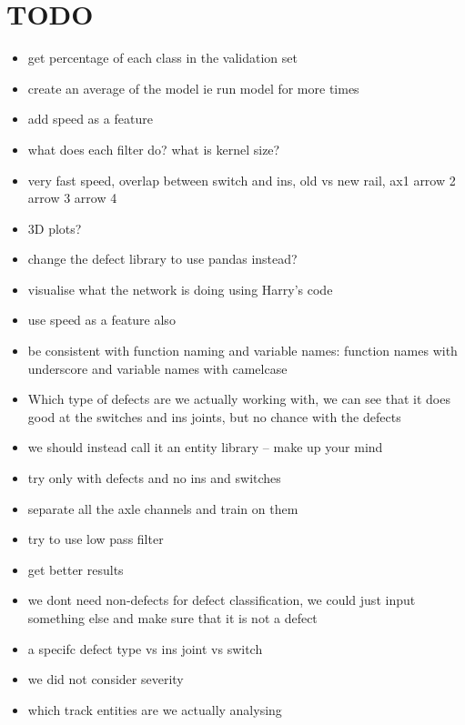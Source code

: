 \newpage
\section{TODO}
\begin{itemize}
	\item get percentage of each class in the validation set
	\item create an average of the model ie run model for more times
	\item add speed as a feature
	\item what does each filter do? what is kernel size?
	\item very fast speed, overlap between switch and ins, old vs new rail, ax1 arrow 2 arrow 3 arrow 4
	\item 3D plots?
	\item change the defect library to use pandas instead?
	\item visualise what the network is doing using Harry's code
	\item use speed as a feature also
	\item be consistent with function naming and variable names: function names with underscore and variable names with camelcase
	\item Which type of defects are we actually working with, we can see that it does good at the switches and ins joints, but no chance with the defects
	\item we should instead call it an entity library -- make up your mind
	\item try only with defects and no ins and switches
	\item separate all the axle channels and train on them
	\item try to use low pass filter
	\item get better results
	\item we dont need non-defects for defect classification, we could just input something else and make sure that it is not a defect
	\item a specifc defect type vs ins joint vs switch
	\item we did not consider severity
	\item which track entities are we actually analysing
\end{itemize}



\newpage
\cleardoublepage
\appendix
